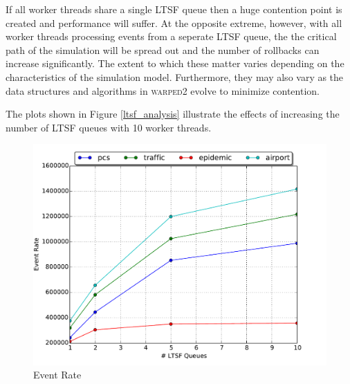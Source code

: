 \documentclass[11pt]{book}
\begin{document}
If all worker threads share a single LTSF queue then a huge contention point is created and
performance will suffer.  At the opposite extreme, however, with all worker threads processing
events from a seperate LTSF queue, the the critical path of the simulation will be spread out and
the number of rollbacks can increase significantly.  The extent to which these matter varies
depending on the characteristics of the simulation model.  Furthermore, they may also vary as the
data structures and algorithms in \textsc{warped2} evolve to minimize contention.

The plots shown in Figure \ref{ltsf_analysis} illustrate the effects of increasing the number of
LTSF queues with 10 worker threads.

\begin{figure}
  \begin{minipage}{.5\textwidth}
    \begin{center}
      \includegraphics[width=\textwidth,keepaspectratio,quiet]{figs/pending_event_set/ltsf_event_rate.pdf} \\
      Event Rate \\
    \end{center}
  \end{minipage}%
  \hfill
  \begin{minipage}{.5\textwidth}
    \begin{center}

\end{center}
\end{minipage}
\end{figure}
\end{document}
